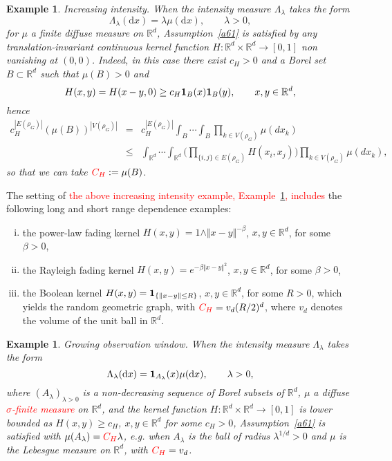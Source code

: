 \documentclass[12pt]{article}
\newcommand{\R}{\mathbb{R}}
\newcommand{\bone}{{\bf 1}}
\newtheorem{example}[prop]{Example}
\def\real{{\mathord{\mathbb R}}}
\numberwithin{equation}{section}
\begin{document}
\noindent
\begin{example}
  \label{examplea}
  Increasing intensity. 
  When the intensity measure $\Lambda_\lambda$ takes the form 
$$\Lambda_\lambda (\mathrm{d}x)=\lambda\mu(\mathrm{d}x),\qquad\lambda>0,$$
 for $\mu$ a finite diffuse measure on $\R^d$, 
 Assumption~\ref{a61} is satisfied by any translation-invariant
 continuous kernel function $H : \real^d\times \real^d \to [0,1]$ non vanishing at $(0,0)$. 
 Indeed, in this case there exist $c_H>0$ and a Borel set $B\subset \real^d$
 such that $\mu ( B)>0$ and
$$
H(x,y) = H(x-y,0) \geq c_H \bone_B(x)\bone_B(y), \qquad x,y \in \real^d,
$$
hence 
\begin{eqnarray*} 
  c_H^{|E(\rho_G)|} ( \mu ( B ))^{|V(\rho_G)|} & = & 
  c_H^{|E(\rho_G)|}
  \int_B \cdots \int_B 
  \prod_{k\in V(\rho_G) } \mu (dx_k)
  \\
   & \leq &  
  \int_{\R^d}\cdots\int_{\R^d}
  \Bigg(
  \prod_{\{i,j\}\in E(\rho_G)} H(x_i,x_j)
  \Bigg)
  \prod_{k\in V(\rho_G) } \mu (dx_k), 
\end{eqnarray*}
so that we can take $\textcolor{red}{C_H} := \mu (B)$. 
\end{example}
The setting of \textcolor{red}{the above increasing intensity example, Example~\ref{examplea},
 includes} the following long and short range dependence examples: 
\begin{enumerate}[i)]
\item
 the power-law fading kernel 
 $H(x,y) = 1 \wedge \Vert x - y \Vert^{- \beta}$, $x,y\in \real^d$, for some $\beta > 0$,  
\item
 the Rayleigh fading kernel $H(x,y) = e^{ - \beta \Vert x - y\Vert^2}$, $x,y\in \real^d$, for some $\beta > 0$, 
\item
 the Boolean kernel $H(x,y)=\bone_{\{\|x-y\|\leq R \}}$, $x,y\in \real^d$,
 for some $R >0$, which yields the random geometric graph, with
 $\textcolor{red}{C_H} = v_d (R /2)^d$,
 where $v_d$ denotes the volume of the unit ball in $\real^d$. 
\end{enumerate}
\vspace{-0.8cm}
\noindent
\begin{example}
  \label{exampleb}
  Growing observation window. 
  When the intensity measure $\Lambda_\lambda$ takes the form 
$$\Lambda_\lambda (\mathrm{d}x)= {\bf 1}_{A_\lambda} (x) \mu(\mathrm{d}x),\qquad\lambda>0,$$
  where $(A_\lambda )_{\lambda >0}$ is a non-decreasing sequence
  of Borel subsets of $\real^d$, 
  $\mu$ a %
  diffuse \textcolor{red}{$\sigma$-finite measure} on $\R^d$, 
  and the kernel function $H : \real^d\times \real^d \to [0,1]$
  is lower bounded as $H(x,y) \geq c_H$, $x,y\in \real^d$ for some $c_H>0$,
  Assumption~\ref{a61} is satisfied with 
  $\mu ( A_\lambda ) = \textcolor{red}{C_H} \lambda$,
  e.g. when $A_\lambda$ is  the ball of radius $\lambda^{1/d} >0$
  and $\mu$ is the Lebesgue measure on $\real^d$,
  with $\textcolor{red}{C_H} = v_d$. 
\end{example} 
\end{document}

